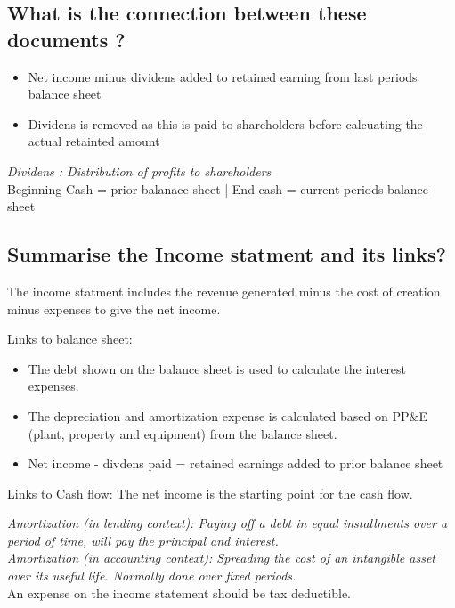 \documentclass[11pt]{scrartcl} %
\begin{document}
\subsection{What is the connection between these documents ?}

\begin{itemize}
	\item Net income minus dividens added to retained earning from last periods balance sheet
	\item Dividens is removed as this is paid to shareholders before calcuating the actual retainted amount
\end{itemize}
  
\textit{Dividens : Distribution of profits to shareholders} \\

Beginning Cash = prior balanace sheet | End cash = current periods balance sheet

\subsection{Summarise the Income statment and its links?}

The income statment includes the revenue generated minus the cost of creation minus expenses to give the net income.

Links to balance sheet:

\begin{itemize}
	\item The debt shown on the balance sheet is used to calculate the interest expenses. 
	\item The depreciation and amortization expense is calculated based on PP\&E (plant, property and equipment) from the balance sheet.
	\item Net income - divdens paid = retained earnings added to prior balance sheet
\end{itemize}

Links to Cash flow: The net income is the starting point for the cash flow.

\textit{Amortization (in lending context): Paying off a debt in equal installments over a period of time, will pay the principal and interest.}\\

\textit{Amortization (in accounting context): Spreading the cost of an intangible asset over its useful life. Normally done over fixed periods.}\\

An expense on the income statement should be tax deductible.
\end{document}
